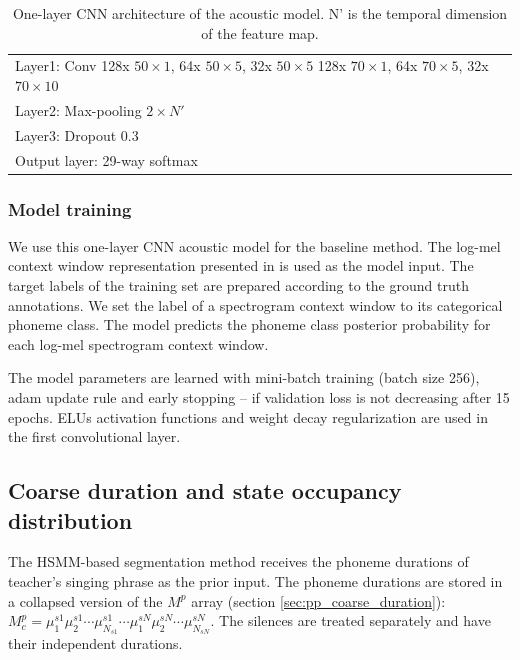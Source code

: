 \begin{table}[ht!]
\centering
\begin{tabular}{l}
\toprule
\makecell[l]{Layer1: Conv 128x $50{\times}1$, 64x $50{\times}5$, 32x $50{\times}5$\\128x $70{\times}1$, 64x $70{\times}5$, 32x $70{\times}10$} \\
Layer2: Max-pooling $2{\times}N'$ \\
Layer3: Dropout 0.3\\
Output layer: 29-way softmax\\
\bottomrule
\end{tabular}
\caption{One-layer CNN architecture of the acoustic model. N' is the temporal dimension of the feature map.}
\label{table:ch5:cnn_acoustic_model}
\end{table}

\subsubsection{Model training}

We use this one-layer CNN acoustic model for the baseline method. The log-mel context window representation presented in  is used as the model input. The target labels of the training set are prepared according to the ground truth annotations. We set the label of a spectrogram context window to its categorical phoneme class. The model predicts the phoneme class posterior probability for each log-mel spectrogram context window.

The model parameters are learned with mini-batch training (batch size 256), adam \cite{kingma2014adam} update rule and early stopping -- if validation loss is not decreasing after 15 epochs. ELUs activation functions and weight decay regularization are used in the first convolutional layer.

\subsection{Coarse duration and state occupancy distribution}

The HSMM-based segmentation method receives the phoneme durations of teacher's singing phrase as the prior input. The phoneme durations are stored in a collapsed version of the $M^p$ array (section \ref{sec:pp_coarse_duration}): $M_c^p=\mu_{1}^{s1} \mu_{2}^{s1} \cdots \mu_{N_{s1}}^{s1} \cdots \mu_{1}^{sN} \mu_{2}^{sN} \cdots \mu_{N_{sN}}^{sN}$. The silences are treated separately and have their independent durations.

